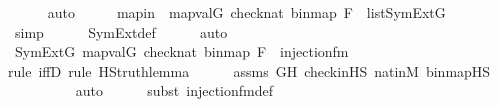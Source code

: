 \begin{isabellebody}
\ \ \ \ \isamarkupfalse%
\ auto\isanewline
\ \ \isamarkupfalse%
\ \isamarkupfalse%
\ mapin\ {\isacharcolon}{\kern0pt}\ {\isachardoublequoteopen}map{\isacharparenleft}{\kern0pt}val{\isacharparenleft}{\kern0pt}G{\isacharparenright}{\kern0pt}{\isacharcomma}{\kern0pt}\ {\isacharbrackleft}{\kern0pt}check{\isacharparenleft}{\kern0pt}nat{\isacharparenright}{\kern0pt}{\isacharcomma}{\kern0pt}\ binmap{\isacharprime}{\kern0pt}{\isacharcomma}{\kern0pt}\ F{\isacharprime}{\kern0pt}{\isacharbrackright}{\kern0pt}{\isacharparenright}{\kern0pt}\ {\isasymin}\ list{\isacharparenleft}{\kern0pt}SymExt{\isacharparenleft}{\kern0pt}G{\isacharparenright}{\kern0pt}{\isacharparenright}{\kern0pt}{\isachardoublequoteclose}\ \isanewline
\ \ \ \ \isamarkupfalse%
\ simp\isanewline
\ \ \ \ \isamarkupfalse%
\ SymExt{\isacharunderscore}{\kern0pt}def\isanewline
\ \ \ \ \isamarkupfalse%
\ auto\isanewline
\isanewline
\ \ \isamarkupfalse%
\ {\isachardoublequoteopen}SymExt{\isacharparenleft}{\kern0pt}G{\isacharparenright}{\kern0pt}{\isacharcomma}{\kern0pt}\ map{\isacharparenleft}{\kern0pt}val{\isacharparenleft}{\kern0pt}G{\isacharparenright}{\kern0pt}{\isacharcomma}{\kern0pt}\ {\isacharbrackleft}{\kern0pt}check{\isacharparenleft}{\kern0pt}nat{\isacharparenright}{\kern0pt}{\isacharcomma}{\kern0pt}\ binmap{\isacharprime}{\kern0pt}{\isacharcomma}{\kern0pt}\ F{\isacharprime}{\kern0pt}{\isacharbrackright}{\kern0pt}{\isacharparenright}{\kern0pt}\ {\isasymTurnstile}\ injection{\isacharunderscore}{\kern0pt}fm{\isacharparenleft}{\kern0pt}{}{\isacharcomma}{\kern0pt}\ {}{\isacharcomma}{\kern0pt}\ {}{\isacharparenright}{\kern0pt}{\isachardoublequoteclose}\ \isanewline
\ \ \ \ \isamarkupfalse%
{\isacharparenleft}{\kern0pt}rule\ iffD{}{\isacharcomma}{\kern0pt}\ rule\ HS{\isacharunderscore}{\kern0pt}truth{\isacharunderscore}{\kern0pt}lemma{\isacharparenright}{\kern0pt}\isanewline
\ \ \ \ \isamarkupfalse%
\ assms\ GH\ check{\isacharunderscore}{\kern0pt}in{\isacharunderscore}{\kern0pt}HS\ nat{\isacharunderscore}{\kern0pt}in{\isacharunderscore}{\kern0pt}M\ binmap{\isacharprime}{\kern0pt}{\isacharunderscore}{\kern0pt}HS\isanewline
\ \ \ \ \ \ \ \ \isamarkupfalse%
\ auto{\isacharbrackleft}{\kern0pt}{}{\isacharbrackright}{\kern0pt}\isanewline
\ \ \ \ \ \isamarkupfalse%
{\isacharparenleft}{\kern0pt}subst\ injection{\isacharunderscore}{\kern0pt}fm{\isacharunderscore}{\kern0pt}def{\isacharparenright}{\kern0pt}\isanewline

\end{isabellebody}
